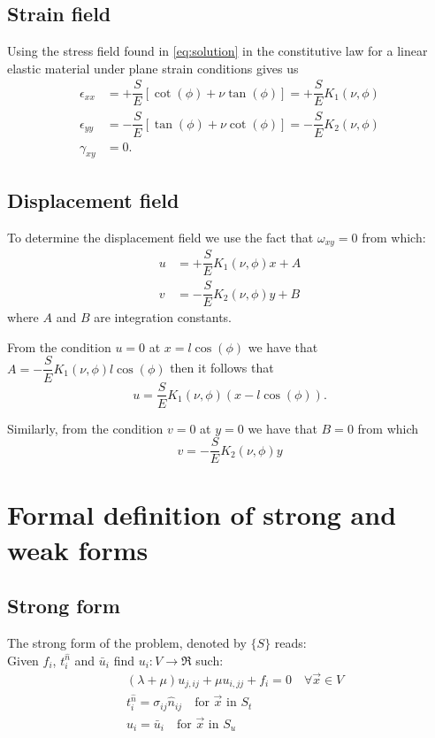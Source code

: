 \subsection*{Strain field}
Using the stress field found in \cref{eq:solution} in the constitutive law for a linear elastic material under plane strain conditions gives us
\begin{equation}
\begin{aligned}
\epsilon_{xx}& = +\dfrac{S}{E}\left[\cot(\phi)+\nu \tan(\phi)\right] = +\dfrac{S}{E}K_{1}(\nu , \phi)\\
\epsilon_{yy}& = -\dfrac{S}{E}\left[\tan(\phi)+\nu \cot(\phi)\right] = -\dfrac{S}{E}K_{2}(\nu , \phi)\\
\gamma_{xy}& = 0.
\end{aligned}
\label{eq:strain part}
\end{equation}

\subsection*{Displacement field}

To determine the displacement field we use the fact that $\omega_{xy}=0$ from which:
\begin{align*}
u &= +\dfrac{S}{E} K_{1}(\nu , \phi)x + A\\
v &= -\dfrac{S}{E} K_{2}(\nu , \phi)y + B
\end{align*}
where $A$ and $B$ are integration constants.

From the condition $u=0$ at $x=l\cos(\phi)$ we have that $A=-\dfrac{S}{E} K_{1}(\nu , \phi)l\cos(\phi)$ then it follows that
\[u=\dfrac{S}{E} K_{1}(\nu , \phi)(x-l\cos(\phi)).\]

Similarly, from the condition $v=0$ at $y=0$ we have that $B=0$ from which
\[v=-\dfrac{S}{E} K_{2}(\nu , \phi)y\]


\section{Formal definition of strong and weak forms}
\subsection*{Strong form}
The strong form of the problem, denoted by $\{ S \}$ reads:\\

Given $f_i$, $t_i^{\hat n}$ and ${\bar u_i}$ find ${u_i}:V \to \Re$ such:
%
\begin{equation} \label{eq:navier_2}
\begin{split}
&\left( {\lambda  + \mu } \right){u_{j,ij}} + \mu {u_{i,jj}} + {f_i} = 0 \quad \text{$\forall \vec x \in V$} \\
&t_i^{\hat n} = {\sigma _{ij}}{\hat n_{ij}} \quad \text{for $\vec x$ in $S_t$}\\
& {u_i} = {{\bar u}_i} \quad \text{for $\vec x$ in $S_u$}
\end{split}
\end{equation}

